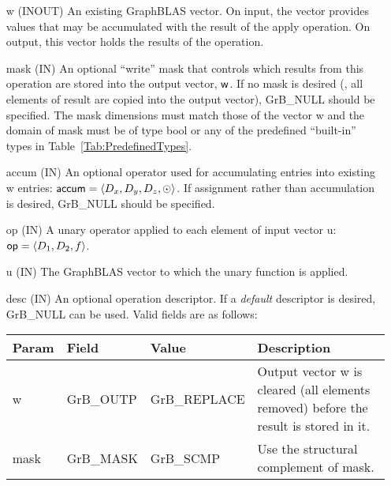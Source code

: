 \begin{itemize}[leftmargin=1in]
    \item[{\sf w}]    ({\sf INOUT}) An existing GraphBLAS vector.  On input,
    the vector provides values that may be accumulated with the result of the
    apply operation.  On output, this vector holds the results of the
    operation.

    \item[{\sf mask}]  ({\sf IN}) An optional ``write'' mask that controls which
    results from this operation are stored into the output vector,
    ${\sf w}$.  If no mask is desired (\ie, all elements
    of result are copied into the output vector), {\sf GrB\_NULL}
    should be specified. The mask dimensions must match those of the
    vector {\sf w} and the domain of {\sf mask} must be
    of type {\sf bool} or any of the predefined ``built-in'' types in
    Table~\ref{Tab:PredefinedTypes}.

    \item[{\sf accum}]    ({\sf IN}) An optional operator used for accumulating
    entries into existing {\sf w} entries: ${\sf accum} = \langle D_x,
    D_y, D_z,\odot \rangle$. If assignment rather than accumulation is
    desired, {\sf GrB\_NULL} should be specified.

    \item[{\sf op}]	({\sf IN}) A unary operator applied to 
	    each element of input vector {\sf u}: ${\sf op} = \langle D_1,D_2,f \rangle$.
    \item[{\sf u}]       ({\sf IN}) The GraphBLAS vector to which the unary function
    is applied.
    
    \item[{\sf desc}]     ({\sf IN}) An optional operation descriptor.  If a 
    \emph{default} descriptor is desired, {\sf GrB\_NULL} can be used.  Valid 
    fields are as follows: \\
    
    \begin{tabular}{lllp{2.5in}}
        Param & Field  & Value & Description \\
        \hline
        {\sf w}    & {\sf GrB\_OUTP} & {\sf GrB\_REPLACE} & Output vector {\sf w}
        is cleared (all elements removed) before the result is stored in it. \\
        
        {\sf mask} & {\sf GrB\_MASK} & {\sf GrB\_SCMP}   & Use the structural 
        complement of {\sf mask}. \\
    \end{tabular}
\end{itemize}


